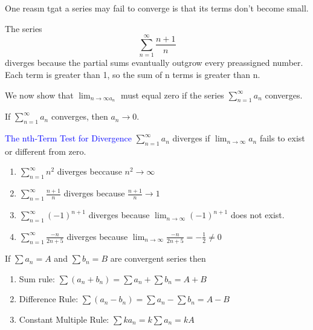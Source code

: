 \documentclass[12pt,a4paper]{article}
\newenvironment{theorem}{\begin{theorembox}}{\end{theorembox}\vspace{1\baselineskip}}
\newcommand{\infsum}{\sum_{n=1}^{\infty}}
\begin{document}
One reasın tgat a series may fail to converge is that its terms don't become small. 

\begin{example}
    The series
    \[\sum_{n=1}^{\infty}\frac{n+1}{n}\]
    diverges because the partial sums evantually outgrow every preassigned number. Each term is greater than 1, so the sum of n terms is greater than n.

    We now show that \(\lim_{n \to \infty a_n} \) must equal zero if the series \(\sum_{n=1}^{\infty}a_n\) converges. 
    
\end{example}


\begin{theorem}
    If \(\sum_{n=1}^{\infty} a_n\) converges, then \(a_n \to 0\).
\end{theorem}


\begin{note}
    \textcolor{blue}{The nth-Term Test for Divergence}
    \( \sum_{n=1}^{\infty} a_n\) diverges if \(\lim_{n \to \infty} a_n\) fails to exist or different from zero.
\end{note}

\newpage

\begin{example}
\begin{enumerate}[label=\alph*)]
        \item \(\sum_{n=1}^{\infty}n^2\) diverges beccause \(n^2 \to \infty\)
        \item \(\infsum \frac{n+1}{n}\) diverges because \(\frac{n+1}{n} \to 1\)
        \item \(\infsum \left(-1\right)^{n+1}\) diverges because \(\lim_{n \to \infty}(-1)^{n+1}\) does not exist.
        \item \(\infsum \frac{-n}{2n+5}\) diverges because  \(\lim_{n \to \infty}\frac{-n}{2n+5} = -\frac{1}{2} \neq 0\)
    \end{enumerate}
\end{example}


\begin{theorem}

If \(\sum a_n = A\) and \(\sum b_n = B\) are convergent series then

\begin{enumerate}
    \item Sum rule: \(\sum (a_n + b_n) = \sum a_n + \sum b_n = A+B\)
    \item Difference Rule: \(\sum (a_n - b_n) = \sum a_n - \sum b_n = A-B\)
    \item Constant Multiple Rule: \(\sum ka_n = k\sum a_n = kA\)
\end{enumerate}

\end{theorem}
\end{document}
